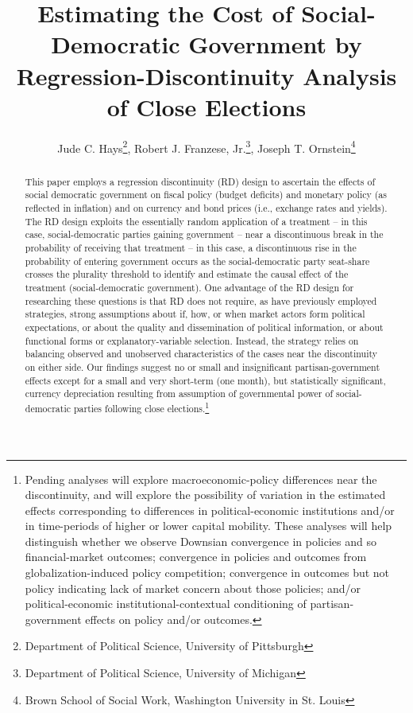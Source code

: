 \documentclass[12pt]{article}
\author{Jude C. Hays\footnote{Department of Political Science, University of Pittsburgh}, Robert J. Franzese, Jr.\footnote{Department of Political Science, University of Michigan}, Joseph T. Ornstein\footnote{Brown School of Social Work, Washington University in St. Louis}}
\title{Estimating the Cost of Social-Democratic Government by Regression-Discontinuity Analysis of Close Elections}
\begin{document}
\singlespacing
\maketitle
\doublespacing

\begin{abstract} %
\noindent This paper employs a regression discontinuity (RD) design to ascertain the effects of social democratic government on fiscal policy (budget deficits) and monetary policy (as reflected in inflation) and on currency and bond prices (i.e., exchange rates and yields). The RD design exploits the essentially random application of a treatment -- in this case, social-democratic parties gaining government -- near a discontinuous break in the probability of receiving that treatment -- in this case, a discontinuous rise in the probability of entering government occurs as the social-democratic party seat-share crosses the plurality threshold to identify and estimate the causal effect of the treatment (social-democratic government). One advantage of the RD design for researching these questions is that RD does not require, as have previously employed strategies, strong assumptions about if, how, or when market actors form political expectations, or about the quality and dissemination of political information, or about functional forms or explanatory-variable selection. Instead, the strategy relies on balancing observed and unobserved characteristics of the cases near the discontinuity on either side. Our findings suggest no or small and insignificant partisan-government effects except for a small and very short-term (one month), but statistically significant, currency depreciation resulting from assumption of governmental power of social-democratic parties following close elections.\footnote{Pending analyses will explore macroeconomic-policy differences near the discontinuity, and will explore the possibility of variation in the estimated effects corresponding to differences in political-economic institutions and/or in time-periods of higher or lower capital mobility. These analyses will help distinguish whether we observe Downsian convergence in policies and so financial-market outcomes; convergence in policies and outcomes from globalization-induced policy competition; convergence in outcomes but not policy indicating lack of market concern about those policies; and/or political-economic institutional-contextual conditioning of partisan-government effects on policy and/or outcomes.}

\end{abstract}
\end{document}
